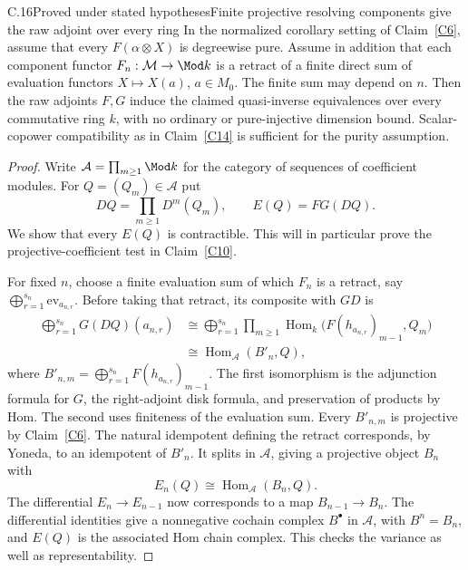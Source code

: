 \begin{claim}{C.16}{Proved under stated hypotheses}{Finite projective resolving components give the raw adjoint over every ring}\label{C16}
In the normalized corollary setting of Claim~\ref{C6}, assume that every $F(\alpha\otimes X)$ is degreewise pure. Assume in addition that each component functor $F_n:\mathcal M\to\Mod k$ is a retract of a finite direct sum of evaluation functors $X\mapsto X(a)$, $a\in M_0$. The finite sum may depend on $n$. Then the raw adjoints $F,G$ induce the claimed quasi-inverse equivalences over every commutative ring $k$, with no ordinary or pure-injective dimension bound. Scalar-copower compatibility as in Claim~\ref{C14} is sufficient for the purity assumption.
\end{claim}
\begin{proof}
Write $\mathcal A=\prod_{m\geq1}\Mod k$ for the category of sequences of coefficient modules. For $Q=(Q_m)\in\mathcal A$ put
\[
 DQ=\prod_{m\geq1}D^m(Q_m),\qquad E(Q)=FG(DQ).
\]
We show that every $E(Q)$ is contractible. This will in particular prove the projective-coefficient test in Claim~\ref{C10}.

For fixed $n$, choose a finite evaluation sum of which $F_n$ is a retract, say $\bigoplus_{r=1}^{s_n}\mathrm{ev}_{a_{n,r}}$. Before taking that retract, its composite with $G D$ is
\[
 \begin{aligned}
 \bigoplus_{r=1}^{s_n}G(DQ)(a_{n,r})
 &\cong\bigoplus_{r=1}^{s_n}
   \prod_{m\geq1}\operatorname{Hom}_k
        \bigl(F(h_{a_{n,r}})_{m-1},Q_m\bigr)\\
 &\cong\operatorname{Hom}_{\mathcal A}(B'_n,Q),
 \end{aligned}
\]
where $B'_{n,m}=\bigoplus_{r=1}^{s_n}F(h_{a_{n,r}})_{m-1}$. The first isomorphism is the adjunction formula for $G$, the right-adjoint disk formula, and preservation of products by Hom. The second uses finiteness of the evaluation sum. Every $B'_{n,m}$ is projective by Claim~\ref{C6}. The natural idempotent defining the retract corresponds, by Yoneda, to an idempotent of $B'_n$. It splits in $\mathcal A$, giving a projective object $B_n$ with
\[
 E_n(Q)\cong\operatorname{Hom}_{\mathcal A}(B_n,Q).
\]
The differential $E_n\to E_{n-1}$ now corresponds to a map $B_{n-1}\to B_n$. The differential identities give a nonnegative cochain complex $B^\bullet$ in $\mathcal A$, with $B^n=B_n$, and $E(Q)$ is the associated Hom chain complex. This checks the variance as well as representability.


\end{proof}
